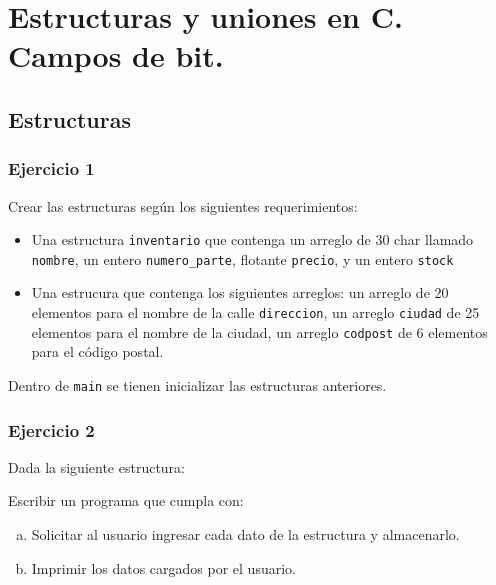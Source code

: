 \section{Estructuras y uniones en C. Campos de bit.}
\setcounter{subsection}{9}

\subsection*{Estructuras}
\subsubsection{Ejercicio 1}
Crear las estructuras según los siguientes requerimientos:
\begin{itemize}
  \item Una estructura \texttt{inventario} que contenga un arreglo de 30 char llamado \texttt{nombre}, un entero \texttt{numero\_parte}, flotante \texttt{precio}, y un entero \texttt{stock}
  \item  Una estrucura que contenga los siguientes arreglos: un arreglo de 20 elementos para el nombre de la calle \texttt{direccion}, un arreglo \texttt{ciudad} de 25 elementos para el nombre de la ciudad, un arreglo \texttt{codpost} de 6 elementos para el código postal.
\end{itemize}
Dentro de \texttt{main} se tienen inicializar las estructuras anteriores.

\subsubsection{Ejercicio 2} 
Dada la siguiente estructura:
\lstset{inputencoding=utf8/latin1}

Escribir un programa que cumpla con:
\begin{enumerate}[a)]
  \item Solicitar al usuario ingresar cada dato de la estructura y almacenarlo.
  \item Imprimir los datos cargados por el usuario.
\end{enumerate}

